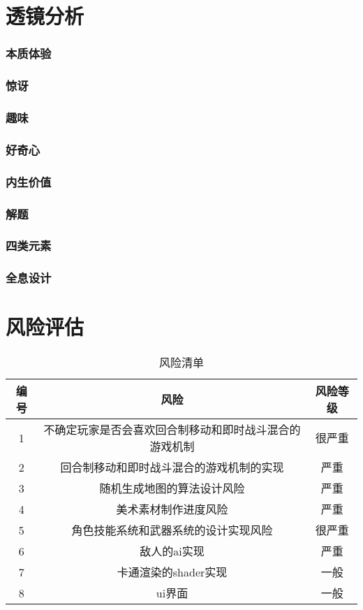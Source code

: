 \documentclass{article}
\begin{document}
\section{透镜分析}
\subsubsection{本质体验}
\subsubsection{惊讶}
\subsubsection{趣味}
\subsubsection{好奇心}
\subsubsection{内生价值}
\subsubsection{解题}
\subsubsection{四类元素}
\subsubsection{全息设计}

\section{风险评估}
\begin{table}[htbp]
\centering
\caption{风险清单}
\begin{tabular}{|c|c|c|}
	\hline
	编号 & 风险 & 风险等级 \\
	\hline
	1 & 不确定玩家是否会喜欢回合制移动和即时战斗混合的游戏机制 & 很严重 \\
	\hline
	2 & 回合制移动和即时战斗混合的游戏机制的实现 & 严重 \\
	\hline
	3 & 随机生成地图的算法设计风险 & 严重 \\
	\hline
	4 & 美术素材制作进度风险 & 严重 \\
	\hline 
	5 & 角色技能系统和武器系统的设计实现风险 & 很严重 \\
	\hline
	6 & 敌人的ai实现 & 严重 \\
	\hline
	7 & 卡通渲染的shader实现 & 一般 \\
	\hline
	8 & ui界面 & 一般 \\
	\hline
\end{tabular}
\end{table}
\end{document}
